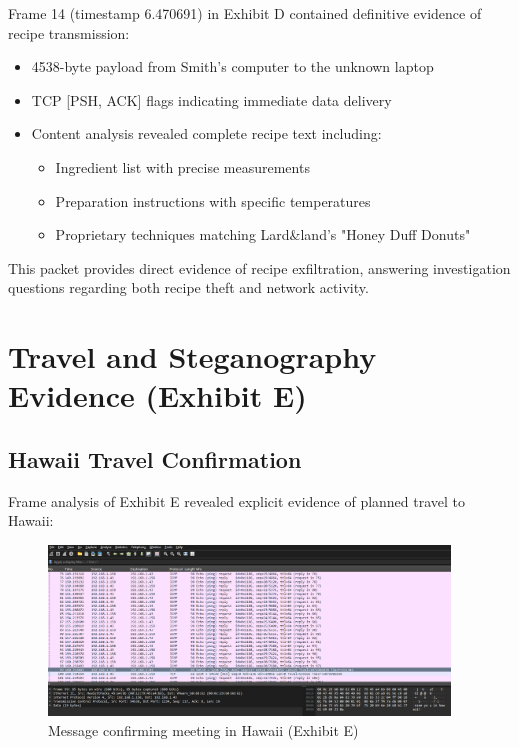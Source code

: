 Frame 14 (timestamp 6.470691) in Exhibit D contained definitive evidence of recipe transmission:

\begin{itemize}
    \item 4538-byte payload from Smith's computer to the unknown laptop
    \item TCP [PSH, ACK] flags indicating immediate data delivery
    \item Content analysis revealed complete recipe text including:
        \begin{itemize}
            \item Ingredient list with precise measurements
            \item Preparation instructions with specific temperatures
            \item Proprietary techniques matching Lard\&land's "Honey Duff Donuts"
        \end{itemize}
\end{itemize}

This packet provides direct evidence of recipe exfiltration, answering investigation questions regarding both recipe theft and network activity.

\section{Travel and Steganography Evidence (Exhibit E)}

\subsection{Hawaii Travel Confirmation}
Frame analysis of Exhibit E revealed explicit evidence of planned travel to Hawaii:

\begin{figure}[htbp]
    \centering
    \includegraphics[width=0.95\textwidth]{images/Network_Analysis/ExhibitE_pcap_hawaii.png}
    \caption{Message confirming meeting in Hawaii (Exhibit E)}
    \label{fig:exhibit_e_hawaii}
\end{figure}

